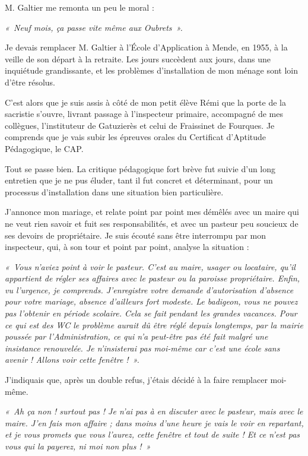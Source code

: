 M. Galtier me remonta un peu le moral :

\textit{«~Neuf mois, ça passe vite même aux Oubrets~».}

Je devais remplacer M. Galtier à l’École d’Application à Mende, en 1955, à la veille de son
départ à la retraite. Les jours succèdent aux jours, dans une inquiétude grandissante, et les
problèmes d’installation de mon ménage sont loin d’être résolus.


C’est alors que je suis assis à côté de mon petit élève Rémi que la porte de la sacristie s’ouvre,
livrant passage à l’inspecteur primaire, accompagné de mes collègues, l’instituteur de
Gatuzierès et celui de Fraissinet de Fourques. Je comprends que je vais subir les épreuves
orales du Certificat d’Aptitude Pédagogique, le CAP.

Tout se passe bien. La critique pédagogique fort brève fut suivie d’un long entretien que je ne
pus éluder, tant il fut concret et déterminant, pour un processus d’installation dans une
situation bien particulière.

J’annonce mon mariage, et relate point par point mes démêlés avec un maire qui ne veut rien
savoir et fuit ses responsabilités, et avec un pasteur peu soucieux de ses devoirs de
propriétaire.
Je suis écouté sans être interrompu par mon inspecteur, qui, à son tour et point par point,
analyse la situation :

\textit{«~Vous n’aviez point à voir le pasteur. C’est au maire, usager ou locataire, qu’il appartient de
régler ses affaires avec le pasteur ou la paroisse propriétaire. Enfin, vu l’urgence, je
comprends.
J’enregistre votre demande d’autorisation d’absence pour votre mariage, absence d’ailleurs
fort modeste. Le badigeon, vous ne pouvez pas l’obtenir en période scolaire. Cela se fait
pendant les grandes vacances. Pour ce qui est des WC le problème aurait dû être réglé depuis
longtemps, par la mairie poussée par l’Administration, ce qui n’a peut-être pas été fait malgré
une insistance renouvelée. Je n’insisterai pas moi-même car c’est une école sans
avenir ! Allons voir cette fenêtre !~».}

J’indiquais que, après un double refus, j’étais décidé à la faire remplacer moi-même.

\textit{«~Ah ça non ! surtout pas ! Je n’ai pas à en discuter avec le pasteur, mais avec le maire. J’en
fais mon affaire ; dans moins d’une heure je vais le voir en repartant, et je vous promets que
vous l’aurez, cette fenêtre et tout de suite ! Et ce n’est pas vous qui la payerez, ni moi non
plus !~»}

